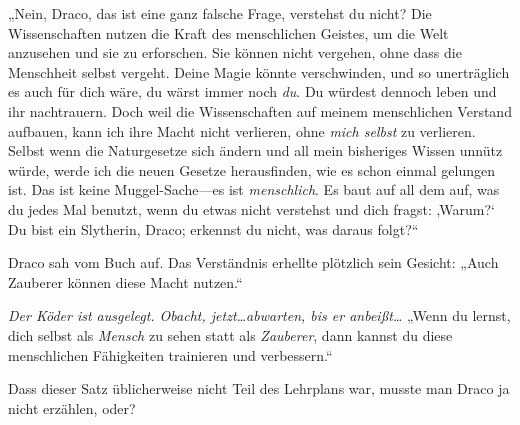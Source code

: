 „Nein, Draco, das ist eine ganz falsche Frage, verstehst du nicht? Die Wissenschaften nutzen die Kraft des menschlichen Geistes, um die Welt anzusehen und sie zu erforschen. Sie können nicht vergehen, ohne dass die Menschheit selbst vergeht. Deine Magie könnte verschwinden, und so unerträglich es auch für dich wäre, du wärst immer noch \emph{du}. Du würdest dennoch leben und ihr nachtrauern. Doch weil die Wissenschaften auf meinem menschlichen Verstand aufbauen, kann ich ihre Macht nicht verlieren, ohne \emph{mich selbst} zu verlieren. Selbst wenn die Naturgesetze sich ändern und all mein bisheriges Wissen unnütz würde, werde ich die neuen Gesetze herausfinden, wie es schon einmal gelungen ist. Das ist keine Muggel-Sache—es ist \emph{menschlich}. Es baut auf all dem auf, was du jedes Mal benutzt, wenn du etwas nicht verstehst und dich fragst: ‚Warum?‘ Du bist ein Slytherin, Draco; erkennst du nicht, was daraus folgt?“

Draco sah vom Buch auf. Das Verständnis erhellte plötzlich sein Gesicht: „Auch Zauberer können diese Macht nutzen.“

\emph{Der Köder ist ausgelegt. Obacht, jetzt…abwarten, bis er anbeißt…} „Wenn du lernst, dich selbst als \emph{Mensch} zu sehen statt als \emph{Zauberer}, dann kannst du diese menschlichen Fähigkeiten trainieren und verbessern.“

Dass dieser Satz üblicherweise nicht Teil des Lehrplans war, musste man Draco ja nicht erzählen, oder?


